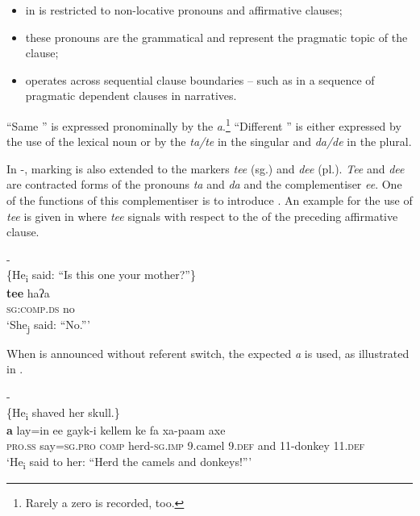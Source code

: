 \documentclass[output=paper
,newtxmath
,modfonts
,nonflat]{langsci/langscibook}
\begin{document}
\begin{itemize}
\item {} in  is restricted to non-locative   pronouns and affirmative clauses;

\item these pronouns are the grammatical  and represent the pragmatic topic of the clause;

\item {} operates across sequential clause boundaries -- such as in a sequence of pragmatic dependent clauses in narratives.
\end{itemize}

“Same ” is expressed pronominally by the  \textit{a}.\footnote{Rarely a zero  is recorded, too.}  “Different ” is either expressed by the use of the lexical noun or by the  \textit{ta/te} in the singular and \textit{da/de} in the plural.

In -,  marking is also extended to the  markers \textit{tee} (sg.) and \textit{dee} (pl.). \textit{Tee} and \textit{dee} are contracted forms of the pronouns \textit{ta} and \textit{da} and the complementiser \textit{ee}. One of the functions of this complementiser is to introduce . An example for the use of \textit{tee} is given in  where \textit{tee} signals  with respect to the  of the preceding affirmative clause. 

\ea\label{ex:apel:21}
{- \citep[285]{Faye1979}}\\
{\-\hspace{0.5cm}\{He\textsubscript{i} said: “Is this one your mother?”\}}\\
\gll \textbf{tee} haʔa\\
     \textsc{sg:comp.ds} no \\
\glt ‘She\textsubscript{j} said: “No.”’
\z

When  is announced without referent switch, the expected  \textit{a} is used, as illustrated in . 

\ea\label{ex:apel:22}
{- \citep[284]{Faye1979}}\\
{\-\hspace{0.5cm}\{He\textsubscript{i} shaved her skull.\}}\\
\gll \textbf{a} lay=in ee gayk-i kellem ke fa xa-paam axe\\
     \textsc{pro.ss} say\textsc{=sg.pro} \textsc{comp} herd\textsc{-sg.imp} \textsc{9.}camel \textsc{9.def} and \textsc{11-}donkey \textsc{11.def} \\
\glt ‘He\textsubscript{i} said to her: “Herd the camels and donkeys!”’
\z
\end{document}
